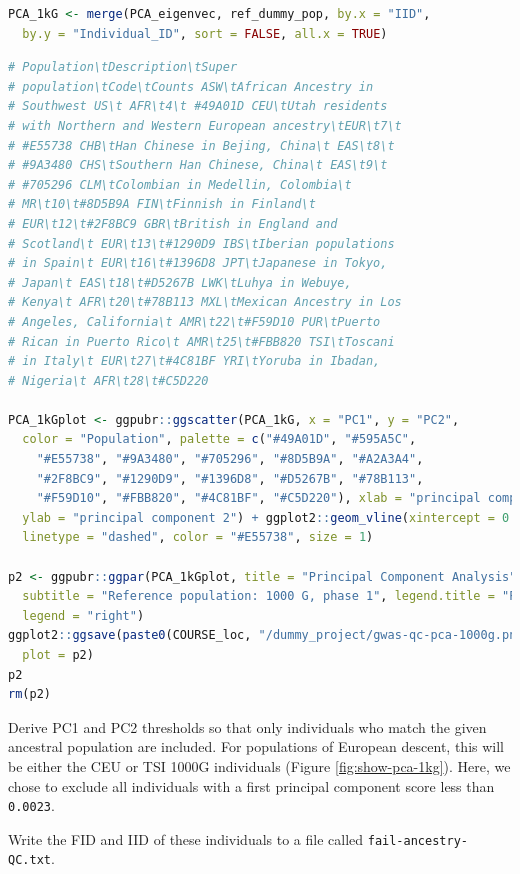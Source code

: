 \documentclass[
]{book}
\newcommand{\passthrough}[1]{#1}
\begin{document}
\begin{lstlisting}[language=R]
PCA_1kG <- merge(PCA_eigenvec, ref_dummy_pop, by.x = "IID",
  by.y = "Individual_ID", sort = FALSE, all.x = TRUE)
\end{lstlisting}

\begin{lstlisting}[language=R]
# Population\tDescription\tSuper
# population\tCode\tCounts ASW\tAfrican Ancestry in
# Southwest US\t AFR\t4\t #49A01D CEU\tUtah residents
# with Northern and Western European ancestry\tEUR\t7\t
# #E55738 CHB\tHan Chinese in Bejing, China\t EAS\t8\t
# #9A3480 CHS\tSouthern Han Chinese, China\t EAS\t9\t
# #705296 CLM\tColombian in Medellin, Colombia\t
# MR\t10\t#8D5B9A FIN\tFinnish in Finland\t
# EUR\t12\t#2F8BC9 GBR\tBritish in England and
# Scotland\t EUR\t13\t#1290D9 IBS\tIberian populations
# in Spain\t EUR\t16\t#1396D8 JPT\tJapanese in Tokyo,
# Japan\t EAS\t18\t#D5267B LWK\tLuhya in Webuye,
# Kenya\t AFR\t20\t#78B113 MXL\tMexican Ancestry in Los
# Angeles, California\t AMR\t22\t#F59D10 PUR\tPuerto
# Rican in Puerto Rico\t AMR\t25\t#FBB820 TSI\tToscani
# in Italy\t EUR\t27\t#4C81BF YRI\tYoruba in Ibadan,
# Nigeria\t AFR\t28\t#C5D220

PCA_1kGplot <- ggpubr::ggscatter(PCA_1kG, x = "PC1", y = "PC2",
  color = "Population", palette = c("#49A01D", "#595A5C",
    "#E55738", "#9A3480", "#705296", "#8D5B9A", "#A2A3A4",
    "#2F8BC9", "#1290D9", "#1396D8", "#D5267B", "#78B113",
    "#F59D10", "#FBB820", "#4C81BF", "#C5D220"), xlab = "principal component 1",
  ylab = "principal component 2") + ggplot2::geom_vline(xintercept = 0.0023,
  linetype = "dashed", color = "#E55738", size = 1)

p2 <- ggpubr::ggpar(PCA_1kGplot, title = "Principal Component Analysis",
  subtitle = "Reference population: 1000 G, phase 1", legend.title = "Populations",
  legend = "right")
ggplot2::ggsave(paste0(COURSE_loc, "/dummy_project/gwas-qc-pca-1000g.png"),
  plot = p2)
p2
rm(p2)
\end{lstlisting}

Derive PC1 and PC2 thresholds so that only individuals who match the given ancestral population are included. For populations of European descent, this will be either the CEU or TSI 1000G individuals (Figure \ref{fig:show-pca-1kg}). Here, we chose to exclude all individuals with a first principal component score less than \passthrough{\lstinline!0.0023!}.

Write the FID and IID of these individuals to a file called \passthrough{\lstinline!fail-ancestry-QC.txt!}.
\end{document}
